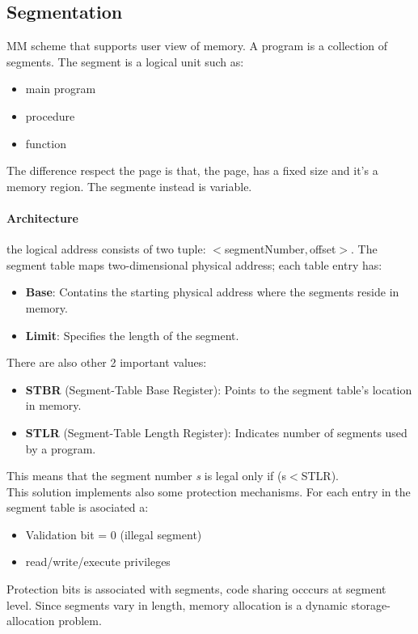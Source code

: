 \documentclass[12pt]{article}
\begin{document}
\subsection{Segmentation}
MM scheme that supports user view of memory. A program is a collection of segments. The segment is a logical unit such as:
\begin{itemize}
  \item main program \item procedure \item function
\end{itemize}
The difference respect the page is that, the page, has a fixed size and it's a memory region. The segmente instead is variable.\\
\paragraph{Architecture} the logical address consists of two tuple: $<$segmentNumber$, $offset$>$. The segment table maps two-dimensional physical address; each table entry has:
\begin{itemize}
  \item \textbf{Base}: Contatins the starting physical address where the segments reside in memory.
  \item \textbf{Limit}: Specifies the length of the segment.
\end{itemize}
There are also other 2 important values:
\begin{itemize}
  \item \textbf{STBR} (Segment-Table Base Register): Points to the segment table's location in memory.
  \item \textbf{STLR} (Segment-Table Length Register): Indicates number of segments used by a program.
\end{itemize}
This means that the segment number \textit{s} is legal only if (s$<$STLR).\\
This solution implements also some protection mechanisms. For each entry in the segment table is asociated a:
\begin{itemize}
  \item Validation bit = 0 (illegal segment)
  \item read/write/execute privileges
\end{itemize}
Protection bits is associated with segments, code sharing occcurs at segment level. Since segments vary in length, memory allocation is a dynamic storage-allocation problem.
\end{document}
